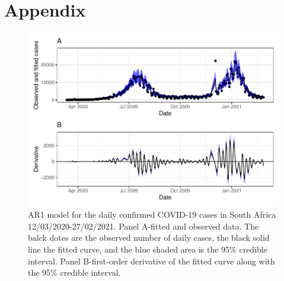 \documentclass[10pt,letterpaper]{article}
\begin{document}
\newpage

\hypertarget{appendix}{%
\section{Appendix}\label{appendix}}

\setcounter{table}{0} \renewcommand{\thetable}{S\arabic{table}} \setcounter{figure}{0} \renewcommand{\thefigure}{S\arabic{figure}}

\begin{figure}[h]
	\includegraphics[width=0.99\linewidth]{COVIDincidenceSA_files/figure-latex/unnamed-chunk-6-1} \caption{AR1 model for the daily confirmed COVID-19 cases in South Africa 12/03/2020-27/02/2021.  Panel A-fitted and observed data. The balck dotes are the observed number of daily cases, the black solid line the fitted curve, and the blue shaded area is the 95\% credible interval. Panel B-first-order derivative of the fitted curve along with the 95\% credible interval.}\label{fig:ar1fitted}
\end{figure}
\end{document}
